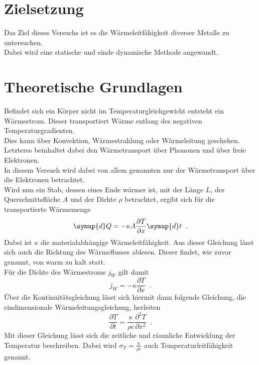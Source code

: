 \section{Zielsetzung}
Das Ziel dieses Versuchs ist es die Wärmeleitfähigkeit diverser Metalle zu untersuchen.\\
Dabei wird eine statische und einde dynamische Methode angewandt.

\section{Theoretische Grundlagen}
Befindet sich ein Körper nicht im Temperaturgleichgewicht entsteht ein Wärmestrom.
Dieser transportiert Wärme entlang des negativen Temperaturgradienten.\\
Dies kann über Konvektion, Wärmestrahlung oder Wärmeleitung geschehen. Letzteres beinhaltet dabei den Wärmetransport über Phononen und über freie Elektronen.\\
In diesem Versuch wird dabei von allem genannten nur der Wärmetransport über die Elektronen betrachtet.\\
Wird nun ein Stab, dessen eines Ende wärmer ist, mit der Länge $L$, der Querschnittsfläche $A$ und der Dichte $\rho$ betrachtet, ergibt sich für die transportierte Wärmemenge  
\begin{equation}
    \symup{d}Q=-\kappa A \frac{\partial T}{\partial x} \symup{d} t \; \; .
\end{equation}
Dabei ist $\kappa$ die materialabhängige Wärmeleitfähigkeit. Aus dieser Gleichung lässt sich auch die Richtung des Wärmeflusses ablesen. 
Dieser findet, wie zuvor genannt, von warm zu kalt statt.\\
Für die Dichte des Wärmestroms $j_W$ gilt damit
\begin{equation*}
    j_W=- \kappa \frac{\partial T}{\partial x} \; \; .
\end{equation*}
Über die Kontinuitätsgleichung lässt sich hiermit dann folgende Gleichung, die eindimensionale Wärmeleitungsgleichung, herleiten
\begin{equation*}
    \frac{\partial T}{\partial t} = \frac{\kappa}{\rho c} \frac{\partial ^2 T}{\partial x ^2} \; \; .
\end{equation*}
Mit dieser Gleichung lässt sich die zeitliche und räumliche Entwicklung der Temperatur beschreiben. Dabei wird $\sigma_T= \frac{\kappa}{\rho c}$ auch Temperaturleitfähigkeit genannt.\\\\

